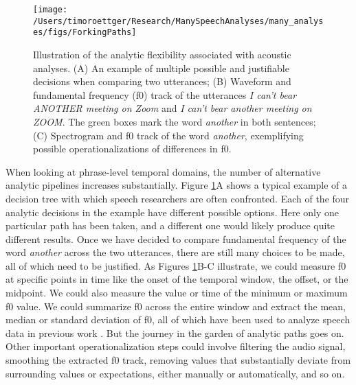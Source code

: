 \documentclass[Review,times,sageh]{sagej}
\begin{document}
\begin{figure}
\texttt{[image: /Users/timoroettger/Research/ManySpeechAnalyses/many\_analyses/figs/ForkingPaths]} \caption{Illustration of the analytic flexibility associated with acoustic analyses. (A) An example of multiple possible and justifiable decisions when comparing two utterances; (B) Waveform and fundamental frequency (f0) track of the utterances \emph{I can't bear ANOTHER meeting on Zoom} and \emph{I can't bear another meeting on ZOOM}. The green boxes mark the word \emph{another} in both sentences; (C) Spectrogram and f0 track of the word \emph{another}, exemplifying possible operationalizations of differences in f0.}\label{fig:forkingPaths}
\end{figure}

When looking at phrase-level temporal domains, the number of alternative analytic pipelines increases substantially.
Figure \ref{fig:forkingPaths}A shows a typical example of a decision tree with which speech researchers are often confronted.
Each of the four analytic decisions in the example have different possible options.
Here only one particular path has been taken, and a different one would likely produce quite different results.
Once we have decided to compare fundamental frequency of the word \emph{another} across the two utterances, there are still many choices to be made, all of which need to be justified.
As Figures \ref{fig:forkingPaths}B-C illustrate, we could measure f0 at specific points in time like the onset of the temporal window, the offset, or the midpoint.
We could also measure the value or time of the minimum or maximum f0 value.
We could summarize f0 across the entire window and extract the mean, median or standard deviation of f0, all of which have been used to analyze speech data in previous work \citep[see][]{gordon2017acoustic}.
But the journey in the garden of analytic paths goes on.
Other important operationalization steps could involve filtering the audio signal, smoothing the extracted f0 track, removing values that substantially deviate from surrounding values or expectations, either manually or automatically, and so on.
\end{document}
